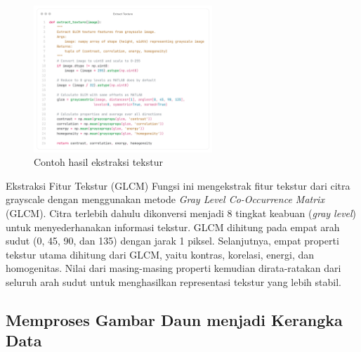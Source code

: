 \begin{figure}[H]
  \centering
  \includegraphics[width=0.6\textwidth]{figure/chapter-4-extract_texture.png}
  \caption{Contoh hasil ekstraksi tekstur}
  \label{fig:extract_rgb}
\end{figure}

{Ekstraksi Fitur Tekstur (GLCM)}
Fungsi ini mengekstrak fitur tekstur dari citra grayscale dengan menggunakan metode \textit{Gray Level Co-Occurrence Matrix} (GLCM). Citra terlebih dahulu dikonversi menjadi 8 tingkat keabuan (\textit{gray level}) untuk menyederhanakan informasi tekstur. GLCM dihitung pada empat arah sudut (0\textdegree, 45\textdegree, 90\textdegree, dan 135\textdegree) dengan jarak 1 piksel. Selanjutnya, empat properti tekstur utama dihitung dari GLCM, yaitu kontras, korelasi, energi, dan homogenitas. Nilai dari masing-masing properti kemudian dirata-ratakan dari seluruh arah sudut untuk menghasilkan representasi tekstur yang lebih stabil.

\subsection{Memproses Gambar Daun menjadi Kerangka Data} \label{IV.Memproses Gambar Daun menjadi Kerangka Data}


